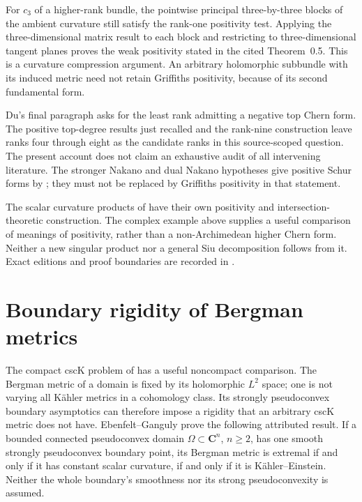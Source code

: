 For $c_3$ of a higher-rank bundle, the pointwise principal
three-by-three blocks of the ambient curvature still satisfy the
rank-one positivity test. Applying the three-dimensional matrix
result to each block and restricting to three-dimensional tangent
planes proves the weak positivity stated in the cited Theorem~0.5.
This is a curvature compression argument. An arbitrary holomorphic
subbundle with its induced metric need not retain Griffiths positivity,
because of its second fundamental form.

Du's final paragraph asks for the least rank admitting a negative
top Chern form. The positive top-degree results just recalled and
the rank-nine construction leave ranks four through eight as the
candidate ranks in this source-scoped question. The present account
does not claim an exhaustive audit of all intervening literature.
The stronger Nakano and dual Nakano hypotheses give positive Schur
forms by \cite[Theorem~1.1]{Finski22CharacteristicPublished};
they must not be replaced by Griffiths positivity in that statement.

The scalar curvature products of
 have their own positivity and
intersection-theoretic construction. The complex example above
supplies a useful comparison of meanings of positivity, rather
than a non-Archimedean higher Chern form. Neither a new singular
product nor a general Siu decomposition follows from it.
Exact editions and proof boundaries are recorded in
.

\section{Boundary rigidity of Bergman metrics}
\label{sec:appH-Bergman-rigidity}

The compact cscK problem of  has a useful
noncompact comparison. The Bergman metric of a domain is fixed by
its holomorphic $L^2$ space; one is not varying all K\"ahler metrics
in a cohomology class. Its strongly pseudoconvex boundary asymptotics
can therefore impose a rigidity that an arbitrary cscK metric does
not have. Ebenfelt--Ganguly \cite[Theorems~1.1--1.3]{EbenfeltGanguly26BergmanV1}
prove the following attributed result. If a bounded connected
pseudoconvex domain $\Omega\subset\mathbf C^n$, $n\geq2$, has one
smooth strongly pseudoconvex boundary point, its Bergman metric is
extremal if and only if it has constant scalar curvature, if and
only if it is K\"ahler--Einstein. Neither the whole boundary's
smoothness nor its strong pseudoconvexity is assumed.

